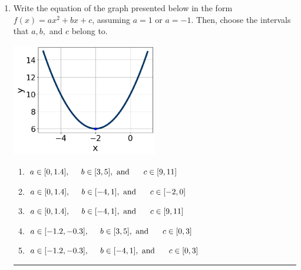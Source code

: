\documentclass[14pt]{extbook}
\newcommand{\litem}[1]{\item#1\hspace*{-1cm}\rule{\textwidth}{0.4pt}}
\begin{document}
\begin{enumerate}
{\begin{enumerate}[label=\Alph*.]
\end{enumerate} }
\litem{
Write the equation of the graph presented below in the form $f(x)=ax^2+bx+c$, assuming  $a=1$ or $a=-1$. Then, choose the intervals that $a, b,$ and $c$ belong to.
\begin{center}
    \includegraphics[width=0.5\textwidth]{../Figures/quadraticGraphToEquationCopyA.png}
\end{center}
\begin{enumerate}[label=\Alph*.]
\item \( a \in [0, 1.4], \hspace*{5mm} b \in [3, 5], \text{ and } \hspace*{5mm} c \in [9, 11] \)
\item \( a \in [0, 1.4], \hspace*{5mm} b \in [-4, 1], \text{ and } \hspace*{5mm} c \in [-2, 0] \)
\item \( a \in [0, 1.4], \hspace*{5mm} b \in [-4, 1], \text{ and } \hspace*{5mm} c \in [9, 11] \)
\item \( a \in [-1.2, -0.3], \hspace*{5mm} b \in [3, 5], \text{ and } \hspace*{5mm} c \in [0, 3] \)
\item \( a \in [-1.2, -0.3], \hspace*{5mm} b \in [-4, 1], \text{ and } \hspace*{5mm} c \in [0, 3] \)


\end{enumerate}}
\end{enumerate}
\end{document}
